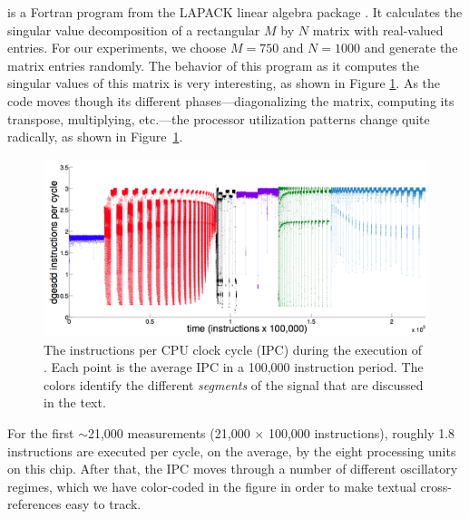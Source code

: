 \svd is a Fortran program from the LAPACK linear algebra package
\cite{lapack}.  It calculates the singular value decomposition of a
rectangular $M$ by $N$ matrix with real-valued entries.  For our experiments, we
choose $M=750$ and $N=1000$ and generate the matrix entries randomly.
% 
% 
The behavior of this program as it computes the singular values of
this matrix is very interesting, as shown in Figure
\ref{fig:svd-ts-colored}.  As the code moves though its different
phases---diagonalizing the matrix, computing its transpose,
multiplying, etc.---the processor utilization patterns change quite radically,
as shown in Figure~\ref{fig:svd-ts-colored}.
\begin{figure}[t]
    \centering
    \includegraphics[width=\columnwidth]{figs/SVD1RegimesColored}
    \caption{The instructions per CPU clock cycle (IPC) during the
      execution of \svd. Each point is the average IPC in a 100,000
      instruction period.  The colors identify the different \emph{
        segments} of the signal that are discussed in the text.}
    \label{fig:svd-ts-colored}
  \end{figure}
For the first $\sim$21,000 measurements (21,000 $\times$ 100,000
instructions), roughly 1.8 instructions are executed per cycle, on the
average, by the eight processing units on this chip.  After that, the
IPC moves through a number of different oscillatory regimes, which we
have color-coded in the figure in order to make textual
cross-references easy to track.

